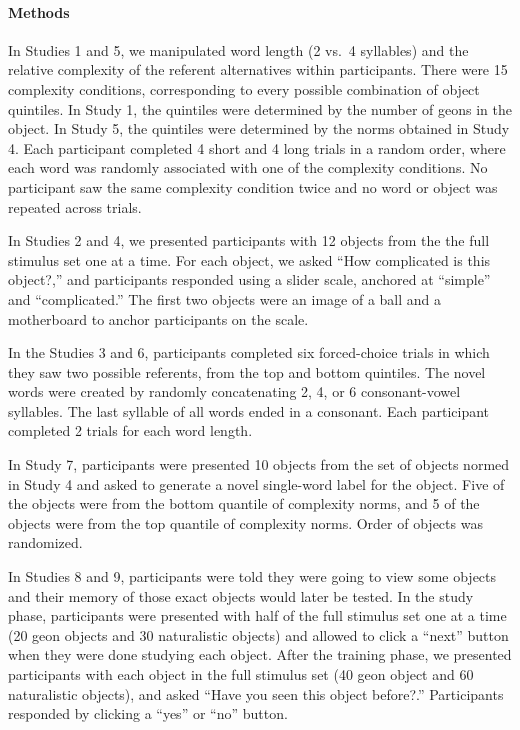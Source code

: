 \documentclass[12pt]{article}
\begin{document}
\paragraph*{Methods}
In Studies 1 and 5, we manipulated word length (2 vs.\ 4 syllables) and the relative complexity of the referent alternatives within participants.  There were 15 complexity conditions, corresponding to every possible combination of object quintiles. In Study 1, the quintiles were determined by the number of geons in the object. In Study 5, the quintiles were determined by the norms obtained in Study 4. Each participant completed 4 short and 4 long trials in a random order, where each word was randomly associated with one of the complexity conditions. No participant saw the same complexity condition twice and no word or object was repeated across trials. 

In Studies 2 and 4, we presented participants with 12 objects from the the full stimulus set one at a time. For each object, we asked ``How complicated is this object?,'' and participants responded using a slider scale, anchored at ``simple'' and ``complicated.'' The first two objects were an image of a ball and a motherboard to anchor participants on the scale.

In the Studies 3 and 6,  participants completed six forced-choice trials in which they saw two possible referents, from the top and bottom quintiles. The novel words were created by randomly concatenating 2, 4, or 6 consonant-vowel syllables. The last syllable of all words ended in a consonant. Each participant completed 2 trials for each word length. 

In Study 7, participants were presented 10 objects from the set of objects normed in Study 4 and asked to generate a novel single-word label for the object. Five of the objects were from the bottom quantile of complexity norms, and 5 of the objects were from the top quantile of complexity norms. Order of objects was randomized.

In Studies 8 and 9, participants were told they were going to view some objects and their memory of those exact objects would later be tested. In the study phase, participants were presented with half of the full stimulus set one at a time (20 geon objects and 30 naturalistic objects) and allowed to click a ``next'' button when they were done studying each object. After the training phase, we presented participants with each object in the full stimulus set  (40 geon object and 60 naturalistic objects), and asked ``Have you seen this object before?.'' Participants responded by clicking a ``yes'' or ``no'' button.
\end{document}
